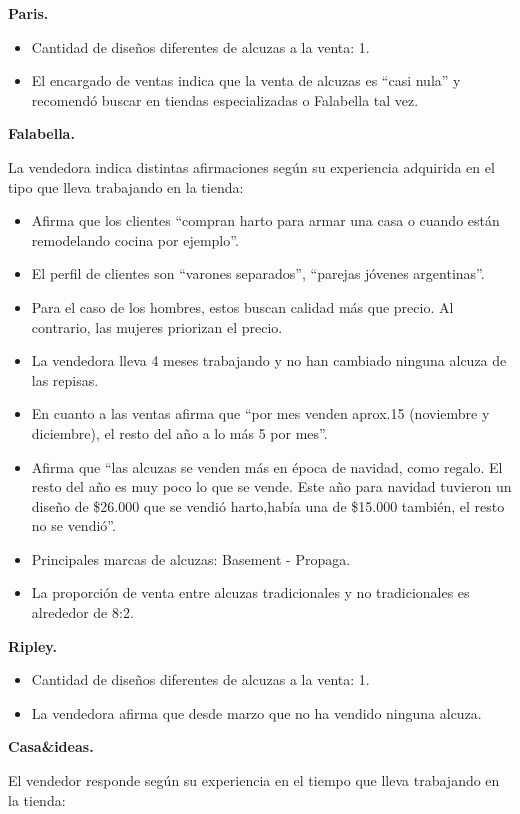 \textbf{Paris.}

\begin{itemize}
\item Cantidad de diseños diferentes de alcuzas a la venta: 1.
\item El encargado de ventas indica que la venta de alcuzas es “casi nula” y recomendó buscar en tiendas especializadas o Falabella tal vez.
\end{itemize}

\textbf{Falabella.}

La vendedora indica distintas afirmaciones según su experiencia adquirida en el tipo que lleva trabajando en la tienda:
\begin{itemize}
\item Afirma que los clientes “compran harto para armar una casa o cuando están remodelando cocina por ejemplo”.
\item El perfil de clientes son “varones separados”, “parejas jóvenes argentinas”.
\item Para el caso de los hombres, estos buscan calidad más que precio. Al contrario, las mujeres priorizan el precio.
\item La vendedora lleva 4 meses trabajando y no han cambiado ninguna alcuza de las repisas.
\item En cuanto a las ventas afirma que “por mes venden aprox.15 (noviembre y diciembre), el resto del año a lo más 5 por mes”.
\item Afirma que “las alcuzas se venden más en época de navidad, como regalo. El resto del año es muy poco lo que se vende. Este año para navidad tuvieron un diseño de \$26.000 que se vendió harto,había una de \$15.000 también, el resto no se vendió”.
\item Principales marcas de alcuzas: Basement - Propaga.
\item La proporción de venta entre alcuzas tradicionales y no tradicionales es alrededor de 8:2.
\end{itemize}

\textbf{Ripley.}

\begin{itemize}
\item Cantidad de diseños diferentes de alcuzas a la venta: 1.
 \item La vendedora afirma que desde marzo que no ha vendido ninguna alcuza.
\end{itemize}

\textbf{Casa\&ideas.}

El vendedor responde según su experiencia en el tiempo que lleva trabajando en la tienda:

